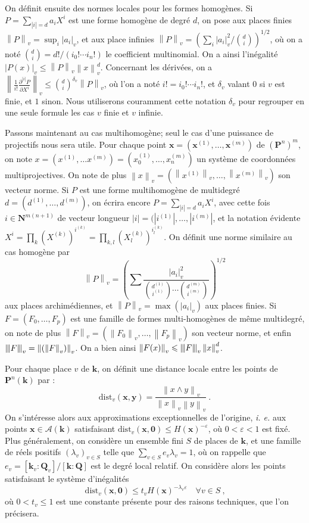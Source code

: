 \documentclass[11pt, twoside, a4paper, french]{article}
\numberwithin{equation}{section}
\newcommand{\lat}[1]{\emph{#1}} \newcommand{\pmm}[1]{\ \text{#1}}
\newcommand{\std}[1]{\mathbf{#1}} \newcommand{\N}{\std{N}} \newcommand{\Z}{\std{Z}}
\newcommand{\Q}{\std{Q}} \newcommand{\R}{\std{R}} \newcommand{\C}{\std{C}}
\newcommand{\Proj}{\std{P}} \newcommand{\Qbar}{\overline{\Q}} \newcommand{\cdn}{\boldsymbol{k}}
\newcommand{\eps}{\varepsilon} \newcommand{\truc}{\,\cdot\,}
\newcommand{\av}[2][v]{\left\lvert#2\right\rvert_{#1}} 		%
\newcommand{\nv}[2][v]{\left\lVert#2\right\rVert_{#1}} 		%
\newcommand{\nnv}[2][v]{\left\lvert\hspace{-1pt}\left\lvert\hspace{-1pt}\left\lvert#2\right\rvert\hspace{-1pt}\right\rvert\hspace{-1pt}\right\rvert_{#1}}
\newcommand{\dv}{{\delta_v}} 					%
\newcommand{\Dv}{\mathrm{dist}_v} 				%
\newcommand{\A}{\mathcal{A}} 					%
\newcommand{\p}[1]{{\boldsymbol{#1}}} 				%
\newcommand{\OA}{\p{0}} 					%
\newcommand{\lgr}[1]{{|#1|}} 					%
\newcommand{\vlg}[1]{\lgr #1} 					%
\begin{document}
On définit ensuite des normes locales pour les formes homogènes. Si $P = \sum_{\lgr{i} =d} a_i X^i$ est une forme homogène de degré $d$, on pose aux places finies $\nv{P} = \sup_i \av{a_i}$, et aux place infinies $\nv{P} = \left( \sum_i \av{a_i}^2/\binom{d}{i} \right)^{1/2}$, où on a noté $\binom{d}{i} = d!/(i_0!\cdots i_n!)$ le coefficient multinomial. On a ainsi l'inégalité $\av{P(x)} \le \nv{P} \nv{x}^d$. Concernant les dérivées, on a $\nv{\frac{1}{i!}\frac{\partial^\lgr{i}P}{\partial X^i}} \le \binom{d}{i}^\dv \nv{P}$, où l'on a noté $i! = i_0! \cdots i_n!$, et $\dv$ valant $0$ si $v$ est finie, et $1$ sinon. Nous utiliserons couramment cette notation $\dv$ pour regrouper en une seule formule les cas $v$ finie et $v$ infinie.

Passons maintenant au cas multihomogène; seul le cas d'une puissance de projectifs nous sera utile. Pour chaque point $\p{x} = (\p{x}^{(1)}, \dots, \p{x}^{(m)})$ de $(\Proj^n)^m$, on note $x = (x^{(1)}, \dots x^{(m)}) = (x_0^{(1)}, \dots, x_n^{(m)})$ un système de coordonnées multiprojectives. On note de plus $\nv{x} = (\nv{x^{(1)}},\dots, \nv{x^{(m)}})$ son vecteur norme. Si $P$ est une forme multihomogène de multidegré $d= (d^{(1)}, \dots, d^{(m)})$, on écrira encore $P = \sum_{\vlg{i}=d} a_i X^i$, avec cette fois $i \in \N^{m(n+1)}$ de vecteur longueur $\vlg{i} = (|i^{(1)}|, \dots, |i^{(m)}|$, et la notation évidente $X^i = \prod_{k} (X^{(k)})^{i^{(k)}} = \prod_{k, l} (X_l^{(k)})^{i_l^{(k)}}$. On définit une norme similaire au cas homogène par 
\[\nv{P} = \left( \sum \frac{ \av{a_i}^2}{\binom{d^{(1)}}{i^{(1)}} \cdots \binom{d^{(m)}}{i^{(m)}} } \right)^{1/2}  \] 
aux places archimédiennes, et $\nv{P} = \max(\av{a_i})$ aux places finies. Si $F = (F_0, \dots, F_p)$ est une famille de formes multi-homogènes de même multidegré, on note de plus $\nv{F} = (\nv{F_0}, \dots, \nv{F_p})$ son vecteur norme, et enfin $\nnv{F} = \nv{(\nv{F})}$. On a bien ainsi $\nv{F(x)} \le \nnv{F}\nv{x}^d$.

Pour chaque place $v$ de $\cdn$, on définit une distance locale entre les points de $\Proj^n(\cdn)$ par :
\[ \Dv(\p{x}, \p{y}) = \frac{\nv{x\wedge y }}{\nv{x}\nv{y}}\pmm{.} \]
On s'intéresse alors aux approximations exceptionnelles de l'origine, \lat{i. e.} aux points $\p{x} \in \A(\cdn)$ satisfaisant $\Dv(\p{x}, \OA) \le H(\p{x})^{-\eps}$, où $0<\eps<1$ est fixé. Plus généralement, on considère un ensemble fini $S$ de places de $\cdn$, et une famille de réels positifs $(\lambda_v)_{v\in S}$ telle que $\sum_{v\in S} e_v \lambda_v = 1$, où on rappelle que $e_v = [\cdn_v : \Q_v]/[\cdn : \Q]$ est le degré local relatif. On considère alors les points satisfaisant le système d'inégalités \[\Dv(\p{x}, \OA) \le t_v H(\p{x})^{-\lambda_v \eps} \quad \forall v \in S \pmm{,} \tag{HP} \label{hyp} \] où $0<t_v\le 1$ est une constante présente pour des raisons techniques, que l'on précisera.
\end{document}
